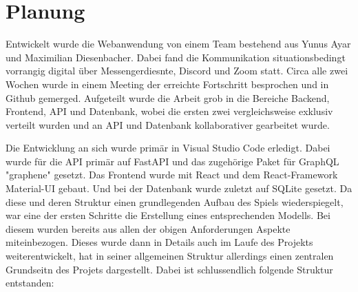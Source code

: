\section{Planung}

Entwickelt wurde die Webanwendung von einem Team bestehend aus Yunus Ayar und Maximilian Diesenbacher. Dabei fand die Kommunikation situationsbedingt vorrangig digital über Messengerdiesnte, Discord und Zoom statt. Circa alle zwei Wochen wurde in einem Meeting der erreichte Fortschritt besprochen und in Github gemerged. Aufgeteilt wurde die Arbeit grob in die Bereiche Backend, Frontend, API und Datenbank, wobei die ersten zwei vergleichsweise exklusiv verteilt wurden und an API und Datenbank kollaborativer gearbeitet wurde.

Die Entwicklung an sich wurde primär in Visual Studio Code erledigt. Dabei wurde für die API primär auf FastAPI und das zugehörige Paket für GraphQL "graphene" gesetzt. Das Frontend wurde mit React und dem React-Framework Material-UI gebaut. Und bei der Datenbank wurde zuletzt auf SQLite gesetzt. Da diese und deren Struktur einen grundlegenden Aufbau des Spiels wiederspiegelt, war eine der ersten Schritte die Erstellung eines entsprechenden Modells. Bei diesem wurden bereits aus allen der obigen Anforderungen Aspekte miteinbezogen. Dieses wurde dann in Details auch im Laufe des Projekts weiterentwickelt, hat in seiner allgemeinen Struktur allerdings einen zentralen Grundseitn des Projets dargestellt. Dabei ist schlussendlich folgende Struktur entstanden:
